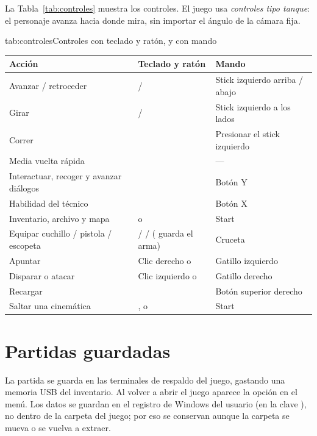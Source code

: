 \documentclass[stu,letterpaper,12pt,donotrepeattitle,floatsintext]{apa7}
\begin{document}

La Tabla~\ref{tab:controles} muestra los controles. El juego usa \textit{controles tipo tanque}:
el personaje avanza hacia donde mira, sin importar el ángulo de la cámara fija.

\begin{TablaAPA}{tab:controles}{Controles con teclado y ratón, y con mando}
\begin{tabularx}{\linewidth}{LP{4.4cm}P{4.2cm}}
\toprule
Acción & Teclado y ratón & Mando \\
\midrule
Avanzar / retroceder &  /  & Stick izquierdo arriba / abajo \\
Girar &  /  & Stick izquierdo a los lados \\
Correr &  & Presionar el stick izquierdo \\
Media vuelta rápida &  & --- \\
Interactuar, recoger y avanzar diálogos &  & Botón Y \\
Habilidad del técnico &  & Botón X \\
Inventario, archivo y mapa &  o  & Start \\
Equipar cuchillo / pistola / escopeta &  /  /  ( guarda el arma) & Cruceta \\
Apuntar & Clic derecho o  & Gatillo izquierdo \\
Disparar o atacar & Clic izquierdo o  & Gatillo derecho \\
Recargar &  & Botón superior derecho \\
Saltar una cinemática & ,  o  & Start \\
\bottomrule
\end{tabularx}
\end{TablaAPA}

\section{Partidas guardadas}

La partida se guarda en las terminales de respaldo del juego, gastando una memoria USB del
inventario. Al volver a abrir el juego aparece la opción  en el menú. Los datos se
guardan en el registro de Windows del usuario (en la clave
), no
dentro de la carpeta del juego; por eso se conservan aunque la carpeta se mueva o se vuelva a
extraer.
\end{document}
